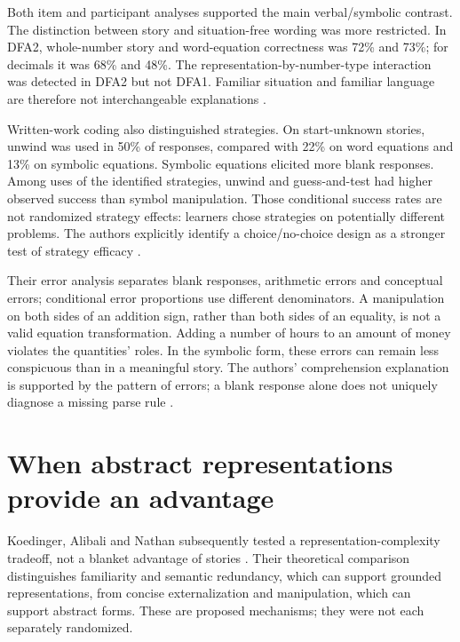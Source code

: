 Both item and participant analyses supported the main verbal/symbolic
contrast. The distinction between story and situation-free wording was
more restricted. In DFA2, whole-number story and word-equation
correctness was 72\% and 73\%; for decimals it was 68\% and 48\%.
The representation-by-number-type interaction was detected in DFA2
but not DFA1. Familiar situation and familiar language are therefore
not interchangeable explanations
\cite[pp.~142--145,Figs.~3--4]{KoedingerNathan2004StoryCTA}.

Written-work coding also distinguished strategies. On start-unknown
stories, unwind was used in 50\% of responses, compared with 22\%
on word equations and 13\% on symbolic equations. Symbolic equations
elicited more blank responses. Among uses of the identified strategies,
unwind and guess-and-test had higher observed success than symbol
manipulation. Those conditional success rates are not randomized
strategy effects: learners chose strategies on potentially different
problems. The authors explicitly identify a choice/no-choice design
as a stronger test of strategy efficacy
\cite[pp.~145--150,Tables~4--5]{KoedingerNathan2004StoryCTA}.

Their error analysis separates blank responses, arithmetic errors and
conceptual errors; conditional error proportions use different
denominators. A manipulation on both sides of an addition sign, rather
than both sides of an equality, is not a valid equation transformation.
Adding a number of hours to an amount of money violates the quantities'
roles. In the symbolic form, these errors can remain less conspicuous
than in a meaningful story. The authors' comprehension explanation is
supported by the pattern of errors; a blank response alone does not
uniquely diagnose a missing parse rule
\cite[pp.~149--156,Figs.~5--6]{KoedingerNathan2004StoryCTA}.

\section{When abstract representations provide an advantage}
\label{sec:p19-cta-complexity}

Koedinger, Alibali and Nathan subsequently tested a
representation-complexity tradeoff, not a blanket advantage of stories
\cite[pp.~366--397]{KoedingerAlibaliNathan2008TradeoffsCTA}.
Their theoretical comparison distinguishes familiarity and semantic
redundancy, which can support grounded representations, from concise
externalization and manipulation, which can support abstract forms.
These are proposed mechanisms; they were not each separately randomized.

